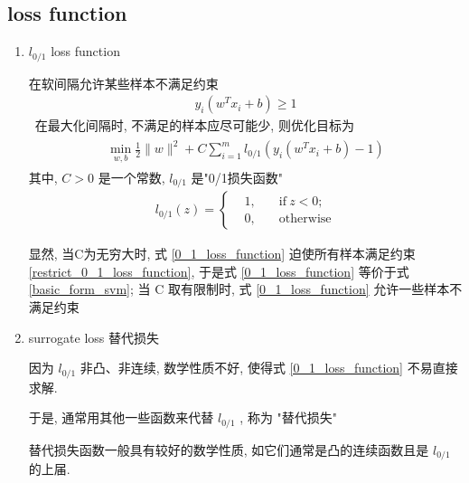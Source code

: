 \documentclass[oneside, 12pt]{ctexbook}
\begin{document}
			\subsection{\quad loss function}
				\begin{enumerate}
					\item $l_{0/1}$ loss function
				
						在软间隔允许某些样本不满足约束 
							\begin{align}
								y_i(w^T x_i + b) \geq 1 \label{restrict_0_1_loss_function}
							\end{align}\
						在最大化间隔时, 不满足的样本应尽可能少, 则优化目标为
							\begin{align}
								\begin{split}
									\min\limits_{w,b} \frac{1}{2} \parallel w \parallel ^2 + C\sum_{i=1}^{m} l_{0/1} (y_i(w^T x_i + b) -1)
								\end{split} \label{0_1_loss_function}
							\end{align}
						其中, $C>0$ 是一个常数, $l_{0/1}$ 是"0/1损失函数"
							\begin{align}
								l_{0/1}(z) = \left\{
								\begin{matrix}
									&1, \quad &\text{if} \ z<0;\\
									&0, \quad &\text{otherwise}
								\end{matrix}
								\right.
							\end{align}
						
						显然, 当C为无穷大时, 式 \ref{0_1_loss_function} 迫使所有样本满足约束 \ref{restrict_0_1_loss_function}, 于是式 \ref{0_1_loss_function} 等价于式 \ref{basic_form_svm}; 当 C 取有限制时, 式 \ref{0_1_loss_function} 允许一些样本不满足约束
						
						
					\item surrogate loss 替代损失
						
						因为 $l_{0/1}$ 非凸、非连续, 数学性质不好, 使得式 \ref{0_1_loss_function} 不易直接求解.
						
						于是, 通常用其他一些函数来代替 $l_{0/1}$ , 称为 "替代损失"
						
						替代损失函数一般具有较好的数学性质, 如它们通常是凸的连续函数且是 $l_{0/1}$ 的上届.
						

\end{enumerate}
\end{document}
